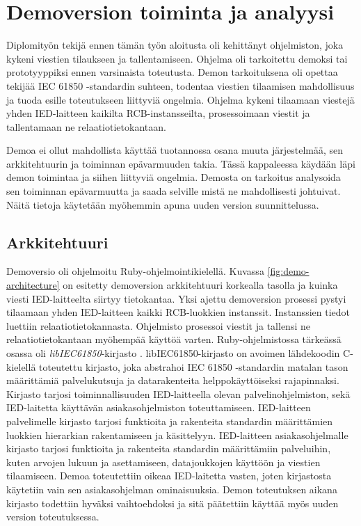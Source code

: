 \chapter{Demoversion toiminta ja analyysi}
\label{ch:projektin-lähtökohdat}
Diplomityön tekijä ennen tämän työn aloitusta oli kehittänyt ohjelmiston, joka kykeni viestien tilaukseen ja tallentamiseen. Ohjelma oli tarkoitettu demoksi tai prototyyppiksi ennen varsinaista toteutusta. Demon tarkoituksena oli opettaa tekijää IEC 61850 -standardin suhteen, todentaa viestien tilaamisen mahdollisuus ja tuoda esille toteutukseen liittyviä ongelmia. Ohjelma kykeni tilaamaan viestejä yhden IED-laitteen kaikilta RCB-instansseilta, prosessoimaan viestit ja tallentamaan ne relaatiotietokantaan.

Demoa ei ollut mahdollista käyttää tuotannossa osana muuta järjestelmää, sen arkkitehtuurin ja toiminnan epävarmuuden takia. Tässä kappaleessa käydään läpi demon toimintaa ja siihen liittyviä ongelmia. Demosta on tarkoitus analysoida sen toiminnan epävarmuutta ja saada selville mistä ne mahdollisesti johtuivat. Näitä tietoja käytetään myöhemmin apuna uuden version suunnittelussa.


\section{Arkkitehtuuri}
\label{ch:demoversio-ja-sen-toiminta}
Demoversio oli ohjelmoitu Ruby-ohjelmointikielellä. Kuvassa \ref{fig:demo-architecture} on esitetty demoversion arkkitehtuuri korkealla tasolla ja kuinka viesti IED-laitteelta siirtyy tietokantaa. Yksi ajettu demoversion prosessi pystyi tilaamaan yhden IED-laitteen kaikki RCB-luok\-ki\-en instanssit. Instanssien tiedot luettiin relaatiotietokannasta. Ohjelmisto prosessoi viestit ja tallensi ne relaatiotietokantaan myöhempää käyttöä varten. Ruby-ohjelmistossa tärkeässä osassa oli \emph{libIEC61850}-kirjasto \cite{libIEC61850-homepage}. libIEC61850-kirjasto on avoimen lähdekoodin C-kielellä toteutettu kirjasto, joka abstrahoi IEC 61850 -standardin matalan tason määrittämiä palvelukutsuja ja datarakenteita helppokäyttöiseksi rajapinnaksi. Kirjasto tarjosi toiminnallisuuden IED-laitteella olevan palvelinohjelmiston, sekä IED-laitetta käyttävän asiakasohjelmiston toteuttamiseen. IED-laitteen palvelimelle kirjasto tarjosi funktioita ja rakenteita standardin määrittämien luokkien hierarkian rakentamiseen ja käsittelyyn. IED-laitteen asiakasohjelmalle kirjasto tarjosi funktioita ja rakenteita standardin määrittämiin palveluihin, kuten arvojen lukuun ja asettamiseen, datajoukkojen käyttöön ja viestien tilaamiseen. Demoa toteutettiin oikeaa IED-laitetta vasten, joten kirjastosta käytetiin vain sen asiakasohjelman ominaisuuksia. Demon toteutuksen aikana kirjasto todettiin hyväksi vaihtoehdoksi ja sitä päätettiin käyttää myös uuden version toteutuksessa.


